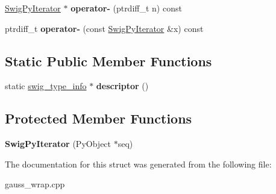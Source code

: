 \begin{DoxyCompactItemize}
\item 
\hypertarget{structswig_1_1_swig_py_iterator_af83adc5dcc576f1224a03202443aa3f7}{\hyperlink{structswig_1_1_swig_py_iterator}{Swig\-Py\-Iterator} $\ast$ {\bfseries operator-\/} (ptrdiff\-\_\-t n) const }\label{structswig_1_1_swig_py_iterator_af83adc5dcc576f1224a03202443aa3f7}

\item 
\hypertarget{structswig_1_1_swig_py_iterator_a7db13b86dee50451ce098aa2a5de33ac}{ptrdiff\-\_\-t {\bfseries operator-\/} (const \hyperlink{structswig_1_1_swig_py_iterator}{Swig\-Py\-Iterator} \&x) const }\label{structswig_1_1_swig_py_iterator_a7db13b86dee50451ce098aa2a5de33ac}

\end{DoxyCompactItemize}
\subsection*{Static Public Member Functions}
\begin{DoxyCompactItemize}
\item 
\hypertarget{structswig_1_1_swig_py_iterator_ac77f47f6ed06f7113252940588a3f39e}{static \hyperlink{structswig__type__info}{swig\-\_\-type\-\_\-info} $\ast$ {\bfseries descriptor} ()}\label{structswig_1_1_swig_py_iterator_ac77f47f6ed06f7113252940588a3f39e}

\end{DoxyCompactItemize}
\subsection*{Protected Member Functions}
\begin{DoxyCompactItemize}
\item 
\hypertarget{structswig_1_1_swig_py_iterator_a88c0a14160ab680c8251f61e01b38d77}{{\bfseries Swig\-Py\-Iterator} (Py\-Object $\ast$seq)}\label{structswig_1_1_swig_py_iterator_a88c0a14160ab680c8251f61e01b38d77}

\end{DoxyCompactItemize}


The documentation for this struct was generated from the following file\-:\begin{DoxyCompactItemize}
\item 
gauss\-\_\-wrap.\-cpp\end{DoxyCompactItemize}
